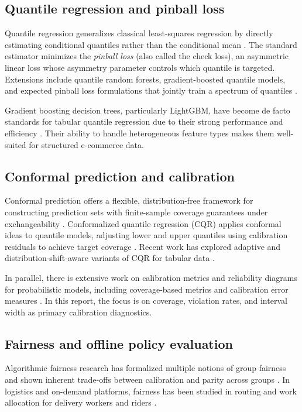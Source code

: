 \documentclass[10pt,twocolumn]{article}
\begin{document}
\subsection{Quantile regression and pinball loss}
Quantile regression generalizes classical least-squares regression by directly estimating conditional quantiles rather than the conditional mean \citep{koenker1978,koenker2001}. The standard estimator minimizes the \emph{pinball loss} (also called the check loss), an asymmetric linear loss whose asymmetry parameter controls which quantile is targeted. Extensions include quantile random forests, gradient-boosted quantile models, and expected pinball loss formulations that jointly train a spectrum of quantiles \citep{biau2024pinball,tagasovska2019epinball}.

Gradient boosting decision trees, particularly LightGBM, have become de facto standards for tabular quantile regression due to their strong performance and efficiency \citep{lightgbm2017}. Their ability to handle heterogeneous feature types makes them well-suited for structured e-commerce data.

\subsection{Conformal prediction and calibration}
Conformal prediction offers a flexible, distribution-free framework for constructing prediction sets with finite-sample coverage guarantees under exchangeability \citep{vovk2005algorithmic,angelopoulos2021gentle}. Conformalized quantile regression (CQR) applies conformal ideas to quantile models, adjusting lower and upper quantiles using calibration residuals to achieve target coverage \citep{romano2019conformalized}. Recent work has explored adaptive and distribution-shift-aware variants of CQR for tabular data \citep{sousa2024adaptive,zhang2023calibration}.

In parallel, there is extensive work on calibration metrics and reliability diagrams for probabilistic models, including coverage-based metrics and calibration error measures \citep{guo2017calibration,levi2022uncertainty}. In this report, the focus is on coverage, violation rates, and interval width as primary calibration diagnostics.

\subsection{Fairness and offline policy evaluation}
Algorithmic fairness research has formalized multiple notions of group fairness and shown inherent trade-offs between calibration and parity across groups \citep{barocas2019fairness,pleiss2017fairness,kleinberg2017impossibility}. In logistics and on-demand platforms, fairness has been studied in routing and work allocation for delivery workers and riders \citep{gupta2022fairfoody,martinez2024fairrouting}.
\end{document}
